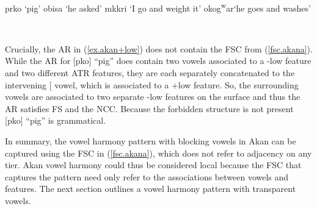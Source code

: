 \documentclass[,doc,floatsintext]{apa6}
\theoremstyle{definition}
\theoremstyle{definition}
\theoremstyle{definition}
\theoremstyle{remark}
\begin{document}
\begin{exe}
  \label{akan_+low}
  \begin{xlist}
    \ex prko  `pig'
    \ex obisa `he asked'
    \ex mkkri  `I go and weight it'
    \ex okog\textsuperscript{w}ar\textraiseglotstop `he goes and washes'
  \end{xlist}
\end{exe}

\begin{exe}
\label{ex.akan+low} \\
\end{exe}

\noindent Crucially, the AR in (\ref{ex.akan+low}) does not contain the
FSC from (\ref{fsc.akana}). While the AR for {[}pko{]}
\enquote{pig} does contain two vowels associated to a -low feature and
two different ATR features, they are each separately concatenated to the
intervening {[}\textipa{3}{]} vowel, which is associated to a +low
feature. So, the surrounding vowels are associated to two separate -low
features on the surface and thus the AR satisfies FS and the NCC.
Because the forbidden structure is not present {[}pko{]}
\enquote{pig} is grammatical.

In summary, the vowel harmony pattern with blocking vowels in Akan can
be captured using the FSC in (\ref{fsc.akana}), which does not refer to
adjacency on any tier. Akan vowel harmony could thus be considered local
because the FSC that captures the pattern need only refer to the
associations between vowels and features. The next section outlines a
vowel harmony pattern with transparent vowels.
\end{document}
